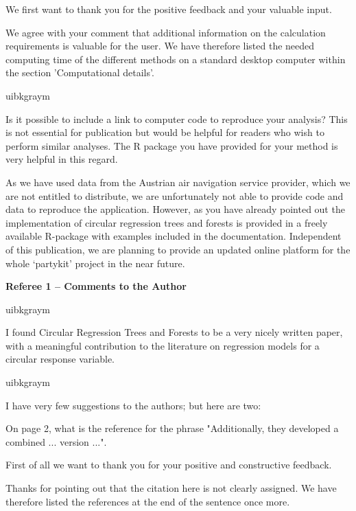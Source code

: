 \documentclass[english, noconfig]{uibklttr}
\newcommand{\section}[1]{{\Large{\textbf{#1}}}}
\newenvironment{re}{
    \begin{color}{uibkgraym}
        \itshape
}{
    \end{color}
}
\begin{document}
We first want to thank you for the positive feedback and your valuable input. 

We agree with your comment that additional information on the calculation
requirements is valuable for the user. We have therefore listed the needed
computing time of the different methods on a standard desktop computer within
the section 'Computational details'.

\vspace{0.5em}
\begin{re}
Is it possible to include a link to computer code to reproduce your
analysis? This is not essential for publication but would be helpful for
readers who wish to perform similar analyses. The R package you have provided
for your method is very helpful in this regard.  
\end{re}

As we have used data from the Austrian air navigation service provider, which
we are not entitled to distribute, we are unfortunately not able to provide
code and data to reproduce the application. However, as you have already
pointed out the implementation of circular regression trees and forests is
provided in a freely available R-package with examples included in the documentation.
Independent of this publication, we are planning to provide an updated online
platform for the whole `partykit' project in the near future.

\newpage

\section{Referee 1 -- Comments to the Author}

\begin{re}
I found Circular Regression Trees and Forests to be a very nicely written
paper, with a meaningful contribution to the literature on regression models
for a circular response variable. 
\end{re}

\begin{re}
I have very few suggestions to the authors; but here are two:

On page 2, what is the reference for the phrase "Additionally, they
developed a combined ... version ...".
\end{re}

First of all we want to thank you for your positive and constructive feedback.

Thanks for pointing out that the citation here is not clearly assigned. We have therefore
listed the references at the end of the sentence once more.
\end{document}
